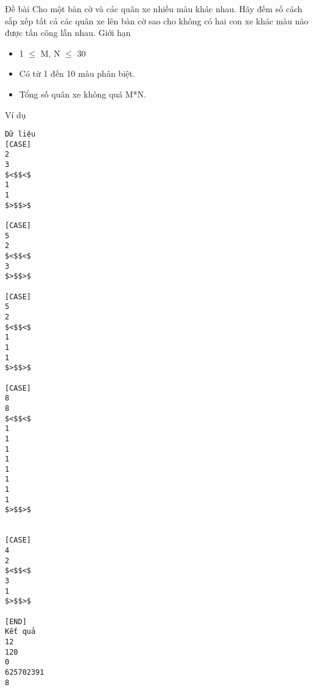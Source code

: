 Đề bài
Cho một bàn cờ và các quân xe nhiều màu khác nhau. Hãy đếm số cách sắp xếp tất cả các quân xe lên bàn cờ sao cho không có hai con xe khác màu nào được tấn công lẫn nhau.
Giới hạn
\begin{itemize}
	\item     1  $\le$  M, N  $\le$  30   
	\item     Có từ 1 đến 10 màu phân biệt.   
	\item     Tổng số quân xe không quá M*N.   
\end{itemize}
Ví dụ
\begin{verbatim}
Dữ liệu
[CASE]
2
3
$<$$<$
1
1
$>$$>$

[CASE]
5
2
$<$$<$
3
$>$$>$

[CASE]
5
2
$<$$<$
1
1
1
$>$$>$

[CASE]
8
8
$<$$<$
1
1
1
1
1
1
1
1
$>$$>$


[CASE]
4
2
$<$$<$
3
1
$>$$>$

[END]
Kết quả
12
120
0
625702391
8
\end{verbatim}